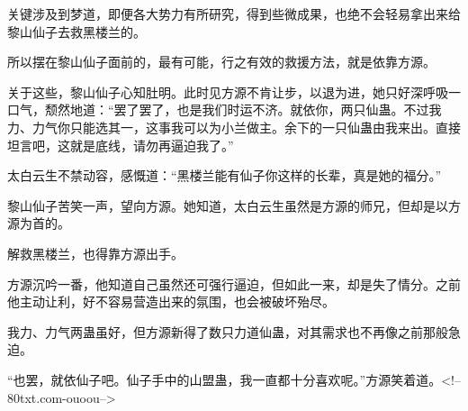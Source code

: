 \begin{this_body}
关键涉及到梦道，即便各大势力有所研究，得到些微成果，也绝不会轻易拿出来给黎山仙子去救黑楼兰的。

所以摆在黎山仙子面前的，最有可能，行之有效的救援方法，就是依靠方源。

关于这些，黎山仙子心知肚明。此时见方源不肯让步，以退为进，她只好深呼吸一口气，颓然地道：“罢了罢了，也是我们时运不济。就依你，两只仙蛊。不过我力、力气你只能选其一，这事我可以为小兰做主。余下的一只仙蛊由我来出。直接坦言吧，这就是底线，请勿再逼迫我了。”

太白云生不禁动容，感慨道：“黑楼兰能有仙子你这样的长辈，真是她的福分。”

黎山仙子苦笑一声，望向方源。她知道，太白云生虽然是方源的师兄，但却是以方源为首的。

解救黑楼兰，也得靠方源出手。

方源沉吟一番，他知道自己虽然还可强行逼迫，但如此一来，却是失了情分。之前他主动让利，好不容易营造出来的氛围，也会被破坏殆尽。

我力、力气两蛊虽好，但方源新得了数只力道仙蛊，对其需求也不再像之前那般急迫。

“也罢，就依仙子吧。仙子手中的山盟蛊，我一直都十分喜欢呢。”方源笑着道。<!--80txt.com-ouoou-->

\end{this_body}


